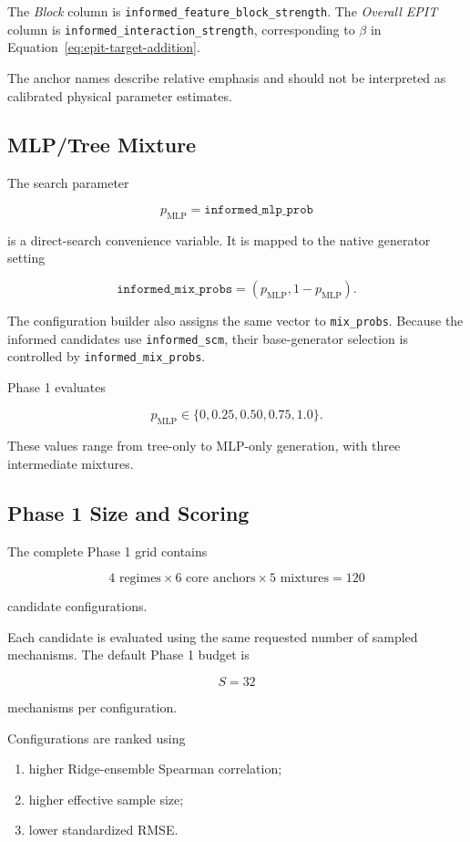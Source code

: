 \documentclass{article}
\begin{document}
The \emph{Block} column is
\texttt{informed\_feature\_block\_strength}. The \emph{Overall EPIT} column is
\texttt{informed\_interaction\_strength}, corresponding to \(\beta\) in Equation~\eqref{eq:epit-target-addition}.

The anchor names describe relative emphasis and should not be interpreted as calibrated physical parameter estimates.

\subsection{MLP/Tree Mixture}

The search parameter

\[
p_{\mathrm{MLP}}
=
\texttt{informed\_mlp\_prob}
\]

is a direct-search convenience variable. It is mapped to the native generator setting

\[
\texttt{informed\_mix\_probs}
=
(p_{\mathrm{MLP}},1-p_{\mathrm{MLP}}).
\]

The configuration builder also assigns the same vector to \texttt{mix\_probs}. Because the informed candidates use \texttt{informed\_scm}, their base-generator selection is controlled by \texttt{informed\_mix\_probs}.

Phase 1 evaluates

\[
p_{\mathrm{MLP}}
\in
\{0,0.25,0.50,0.75,1.0\}.
\]

These values range from tree-only to MLP-only generation, with three intermediate mixtures.

\subsection{Phase 1 Size and Scoring}

The complete Phase 1 grid contains

\[
4 \text{ regimes}
\times
6 \text{ core anchors}
\times
5 \text{ mixtures}
=
120
\]

candidate configurations.

Each candidate is evaluated using the same requested number of sampled mechanisms. The default Phase 1 budget is

\[
S=32
\]

mechanisms per configuration.

Configurations are ranked using

\begin{enumerate}
    \item higher Ridge-ensemble Spearman correlation;
    \item higher effective sample size;
    \item lower standardized RMSE.
\end{enumerate}
\end{document}
